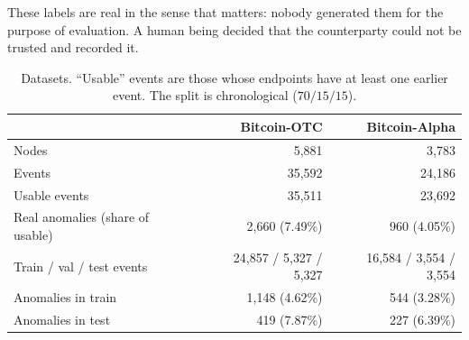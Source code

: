 \documentclass[pdflatex,sn-basic]{sn-jnl}
\theoremstyle{definition}
\theoremstyle{plain}
\begin{document}
These labels are real in the sense that matters: nobody generated them for
the purpose of evaluation. A human being decided that the counterparty could
not be trusted and recorded it.

\begin{table}[!t]
\caption{Datasets. ``Usable'' events are those whose endpoints have at least
one earlier event. The split is chronological ($70/15/15$).}
\label{tab:data}
\centering
\footnotesize
\setlength{\tabcolsep}{4.5pt}
\begin{tabular}{@{}lrr@{}}
\toprule
 & Bitcoin-OTC & Bitcoin-Alpha\\
\midrule
Nodes & 5{,}881 & 3{,}783\\
Events & 35{,}592 & 24{,}186\\
Usable events & 35{,}511 & 23{,}692\\
Real anomalies (share of usable) & 2{,}660 (7.49\%) & 960 (4.05\%)\\
Train / val / test events & 24{,}857 / 5{,}327 / 5{,}327 & 16{,}584 / 3{,}554 / 3{,}554\\
Anomalies in train & 1{,}148 (4.62\%) & 544 (3.28\%)\\
Anomalies in test & 419 (7.87\%) & 227 (6.39\%)\\
\bottomrule
\end{tabular}
\end{table}
\end{document}
